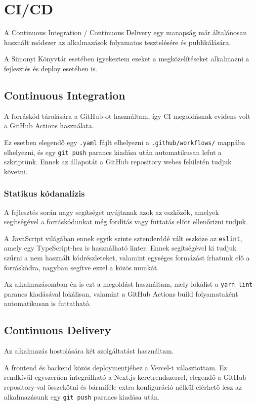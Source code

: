 \chapter{CI/CD}

A Continuous Integration / Continuous Delivery egy manapság már általánosan használt módszer az alkalmazások folyamatos tesztelésére és publikálására.

A Simonyi Könyvtár esetében igyekeztem ezeket a megközelítéseket alkalmazni a fejlesztés és deploy esetében is.

\section{Continuous Integration}

A forráskód tárolására a GitHub-ot használtam, így CI megoldásnak evidens volt a GitHub Actions használata.

Ez esetben elegendő egy \lstinline|.yaml| fájlt elhelyezni a \lstinline|.github/workflows/| mappába elhelyezni, és egy \lstinline|git push|
parancs kiadása után automatikusan lefut a szkriptünk. Ennek az állapotát a GitHub repository webes felületén tudjuk követni.

\subsection{Statikus kódanalízis}

A fejlesztés során nagy segítséget nyújtanak azok az eszközök, amelyek segítségével a forráskódunkat még fordítás vagy futtatás
előtt ellenőrizni tudjuk.

A JavaScript világában ennek egyik szinte sztenderddé vált eszköze az \lstinline|eslint|, amely egy TypeScript-hez is használható linter.
Ennek segítségével ki tudjuk szűrni a nem használt kódrészleteket, valamint egységes formázást írhatunk elő a forráskódra, nagyban segítve
ezzel a közös munkát.

Az alkalmazásomban én is ezt a megoldást használtam, mely lokálist a \lstinline|yarn lint| parancs kiadásával lokálisan, valamint
a GitHub Actions build folyamataként automatikusan is futtatható.

\section{Continuous Delivery}

Az alkalmazás hostolására két szolgáltatást használtam.

A frontend és backend közös deploymentjéhez a Vercel-t választottam. Ez rendkívül egyszerűen integrálható a Next.js keretrendszerrel,
elegendő a GitHub repository-val összekötni és bármiféle extra konfiguráció nélkül elérhető lesz az alkalmazásunk egy \lstinline|git push| parancs kiadása után.

